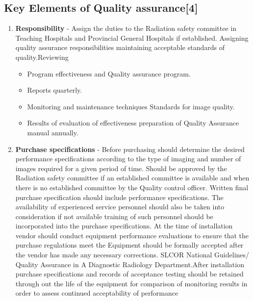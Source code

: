 \documentclass[12pt]{article}
\begin{document}
\subsection{Key Elements of Quality assurance\tiny{[4]}}
\begin{enumerate}
    \item \textbf{Responsibility} - Assign the duties to the Radiation safety committee in Teaching Hospitals and Provincial General Hospitals if established.
    Assigning quality assurance responsibilities maintaining acceptable standards of quality.Reviewing \begin{itemize}
        \item Program effectiveness and Quality assurance
program. 
        \item Reports quarterly. 
        \item Monitoring and maintenance techniques
Standards for image quality.
        \item Results of evaluation of effectiveness
preparation of Quality Assurance manual
annually.
    \end{itemize} 
   
    \item \textbf{Purchase specifications} - Before purchasing should determine the desired performance specifications according to the type of imaging and number of images required for a given period of time. Should be approved by the Radiation safety committee if an established committee is available and when there is no established committee by the Quality control officer. Written final purchase specification should include performance specifications. The availability of experienced service personnel should also be taken into consideration if not available training of such personnel should be incorporated into the purchase specifications. \newline At the time of installation vendor should conduct equipment performance evaluations to ensure that the purchase regulations meet the Equipment should be formally accepted after the vendor has made any necessary corrections. SLCOR National Guidelines/ Quality Assurance in A Diagnostic Radiology Department.\newline After installation purchase specifications and records of acceptance testing should be retained through out the life of the equipment for comparison of monitoring results in order to assess continued acceptability of performance\newline


\end{enumerate}
\end{document}
